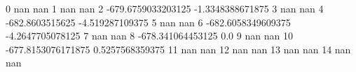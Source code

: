 0 nan nan
1 nan nan
2 -679.6759033203125 -1.3348388671875
3 nan nan
4 -682.8603515625 -4.519287109375
5 nan nan
6 -682.6058349609375 -4.2647705078125
7 nan nan
8 -678.341064453125 0.0
9 nan nan
10 -677.8153076171875 0.5257568359375
11 nan nan
12 nan nan
13 nan nan
14 nan nan

